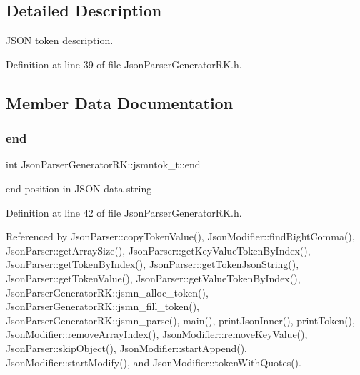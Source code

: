 \subsection{Detailed Description}
J\+S\+ON token description. 

Definition at line 39 of file Json\+Parser\+Generator\+R\+K.\+h.



\subsection{Member Data Documentation}
\mbox{\label{struct_json_parser_generator_r_k_1_1jsmntok__t_a7bd5d158fd8e6c1be21ab29994ef6bef}} 
\subsubsection{\texorpdfstring{end}{end}}
{\footnotesize\ttfamily int Json\+Parser\+Generator\+R\+K\+::jsmntok\+\_\+t\+::end}



end position in J\+S\+ON data string 



Definition at line 42 of file Json\+Parser\+Generator\+R\+K.\+h.



Referenced by Json\+Parser\+::copy\+Token\+Value(), Json\+Modifier\+::find\+Right\+Comma(), Json\+Parser\+::get\+Array\+Size(), Json\+Parser\+::get\+Key\+Value\+Token\+By\+Index(), Json\+Parser\+::get\+Token\+By\+Index(), Json\+Parser\+::get\+Token\+Json\+String(), Json\+Parser\+::get\+Token\+Value(), Json\+Parser\+::get\+Value\+Token\+By\+Index(), Json\+Parser\+Generator\+R\+K\+::jsmn\+\_\+alloc\+\_\+token(), Json\+Parser\+Generator\+R\+K\+::jsmn\+\_\+fill\+\_\+token(), Json\+Parser\+Generator\+R\+K\+::jsmn\+\_\+parse(), main(), print\+Json\+Inner(), print\+Token(), Json\+Modifier\+::remove\+Array\+Index(), Json\+Modifier\+::remove\+Key\+Value(), Json\+Parser\+::skip\+Object(), Json\+Modifier\+::start\+Append(), Json\+Modifier\+::start\+Modify(), and Json\+Modifier\+::token\+With\+Quotes().

\mbox{\label{struct_json_parser_generator_r_k_1_1jsmntok__t_a4fe2f163e9a419ab974b88e95d9e6d9e}} 
